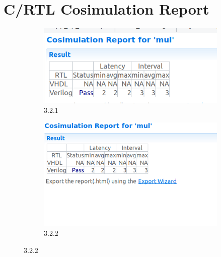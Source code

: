 \documentclass{article}
\begin{document}
\section{C/RTL Cosimulation Report}
\vspace{1cm}
\begin{figure}[h]
\centering
\begin{subfigure}[b]{0.8\textwidth}
    \centering
\includegraphics[width=\textwidth]{figs/34a.png}
    \caption{3.2.1}
    \label{fig:my_label}
\end{subfigure}
\hfill
\begin{subfigure}[b]{0.8\textwidth}
    \centering
\includegraphics[width=\textwidth]{figs/34b.png}
    \caption{3.2.2}
    \label{fig:my_label}
\end{subfigure}
\end{figure}
\end{document}
